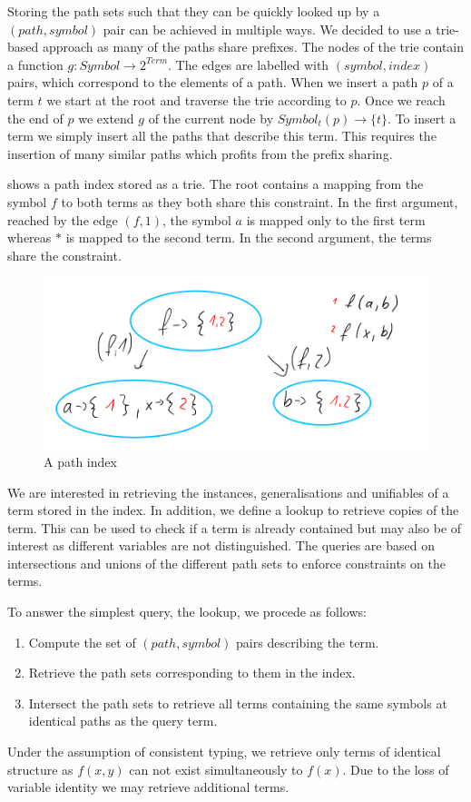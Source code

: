 Storing the path sets such that they can be quickly looked up by a $(path, symbol)$ pair can be achieved in multiple ways. We decided to use a trie-based approach as many of the paths share prefixes. The nodes of the trie contain a function $g: Symbol  \longrightarrow 2^{Term}$. The edges are labelled with $(symbol, index)$ pairs, which correspond to the elements of a path. When we insert a path $p$ of a term $t$ we start at the root and traverse the trie according to $p$. Once we reach the end of $p$ we extend $g$ of the current node by $Symbol_{t}(p) \longrightarrow \{t\}$. To insert a term we simply insert all the paths that describe this term. This requires the insertion of many similar paths which profits from the prefix sharing.

 shows a path index stored as a trie. The root contains a mapping from the symbol $f$ to both terms as they both share this constraint. In the first argument, reached by the edge $(f,1)$, the symbol $a$ is mapped only to the first term whereas $*$ is mapped to the second term. In the second argument, the terms share the constraint.
\begin{figure}[h]
\centering
\includegraphics[scale=0.25]{figures/path_index.png}
\caption{A path index}
\label{pathindex}
\end{figure}

We are interested in retrieving the instances, generalisations and unifiables of a term stored in the index. In addition, we define a lookup to retrieve copies of the term. This can be used to check if a term is already contained but may also be of interest as different variables are not distinguished. The queries are based on intersections and unions of the different path sets to enforce constraints on the terms.

To answer the simplest query, the lookup, we procede as follows:
\begin{enumerate}
  \item Compute the set of $(path, symbol)$ pairs describing the term.
  \item Retrieve the path sets corresponding to them in the index.
  \item Intersect the path sets to retrieve all terms containing the same symbols at identical paths as the query term.
\end{enumerate}
  Under the assumption of consistent typing, we retrieve only terms of identical structure as $f(x,y)$ can not exist simultaneously to $f(x)$. Due to the loss of variable identity we may retrieve additional terms.

